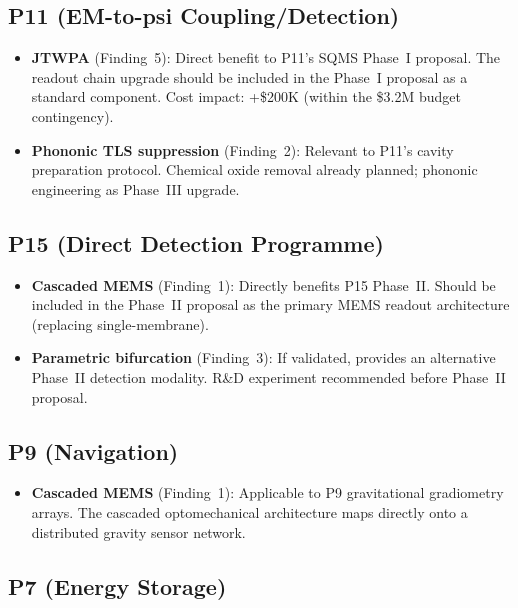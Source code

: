 \documentclass[11pt]{article}
\theoremstyle{definition}
\theoremstyle{remark}
\begin{document}
\subsection{P11 (EM-to-psi Coupling/Detection)}

\begin{itemize}[nosep]
\item \textbf{JTWPA} (Finding~5): Direct benefit to P11's SQMS
  Phase~I proposal. The readout chain upgrade should be included in
  the Phase~I proposal as a standard component. Cost impact: +\$200K
  (within the \$3.2M budget contingency).
\item \textbf{Phononic TLS suppression} (Finding~2): Relevant to
  P11's cavity preparation protocol. Chemical oxide removal already
  planned; phononic engineering as Phase~III upgrade.
\end{itemize}

\subsection{P15 (Direct Detection Programme)}

\begin{itemize}[nosep]
\item \textbf{Cascaded MEMS} (Finding~1): Directly benefits P15
  Phase~II. Should be included in the Phase~II proposal as the
  primary MEMS readout architecture (replacing single-membrane).
\item \textbf{Parametric bifurcation} (Finding~3): If validated,
  provides an alternative Phase~II detection modality. R\&D
  experiment recommended before Phase~II proposal.
\end{itemize}

\subsection{P9 (Navigation)}

\begin{itemize}[nosep]
\item \textbf{Cascaded MEMS} (Finding~1): Applicable to P9
  gravitational gradiometry arrays. The cascaded optomechanical
  architecture maps directly onto a distributed gravity sensor
  network.
\end{itemize}

\subsection{P7 (Energy Storage)}
\end{document}
